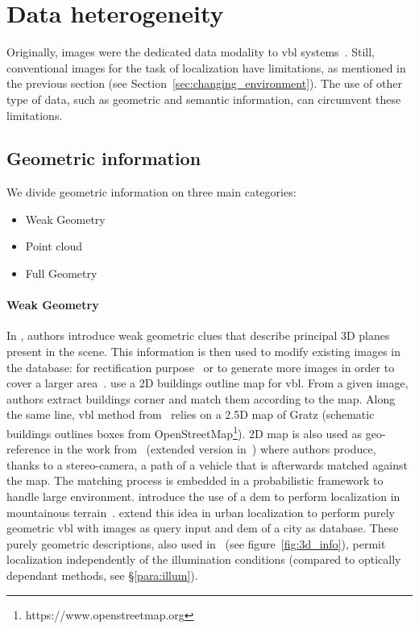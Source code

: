 \section{Data heterogeneity}
\label{sec:application}	



	Originally, images were the dedicated data modality to \ac{vbl} systems~\citep{Robertson2004}. Still, conventional images for the task of localization have limitations, as mentioned in the previous section (see Section~\ref{sec:changing_environment}). The use of other type of data, such as geometric and semantic information, can circumvent these limitations.

	\subsection{Geometric information}
		\label{subsec:geometric_info}		
		We divide geometric information on three main categories:
		\begin{itemize}
			\item Weak Geometry
			\item Point cloud		
			\item Full Geometry
		\end{itemize}
        
		\paragraph{Weak Geometry}
			\label{subsubsec:weak_geometry}			
			In \citep{Torii2015,Chen2011}, authors introduce weak geometric clues that describe principal 3D planes present in the scene. This information is then used to modify existing images in the database: for rectification purpose~\citep{Chen2011} or to generate more images in order to cover a larger area~\citep{Torii2015}. \citet{Cham2010} use a 2D buildings outline map for \ac{vbl}. From a given image, authors extract buildings corner and match them according to the map. Along the same line, \ac{vbl} method from~\citep{Arth2015} relies on a 2.5D map of Gratz (schematic buildings outlines boxes from OpenStreetMap\footnote{https://www.openstreetmap.org}). 2D map is also used as geo-reference in the work from~\citep{Brubaker2013} (extended version in~\citep{Brubaker2016}) where authors produce, thanks to a stereo-camera, a path of a vehicle that is afterwards matched against the map. The matching process is embedded in a probabilistic framework to handle large environment. \citet{Baatz2012} introduce the use of a \ac{dem} to perform localization in mountainous terrain~\citep{Ramalingam2010,Tzeng2013,Chen2015}. \citet{Bansal2014} extend this idea in urban localization to perform purely geometric \ac{vbl} with images as query input and \ac{dem} of a city as database. These purely geometric descriptions, also used in~\citep{Matei2013,Christie2016,Ramalingam2010,Ramalingam2011} (see figure~\ref{fig:3d_info}), permit localization independently of the illumination conditions (compared to optically dependant methods, see \S\ref{para:illum}).

